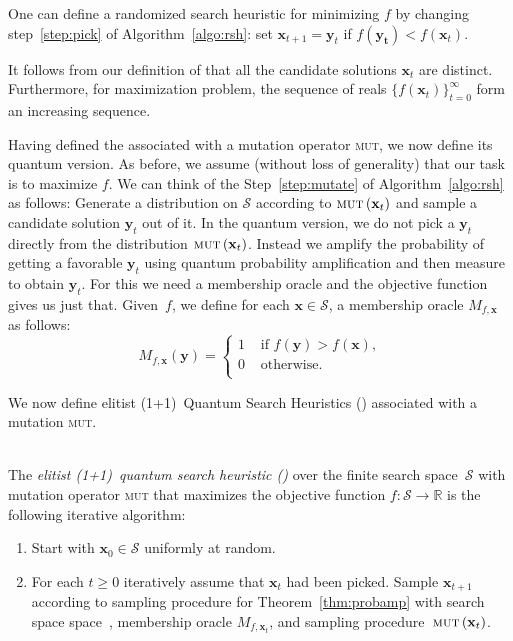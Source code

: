 One can define a randomized search heuristic for minimizing $f$ by changing step~\ref{step:pick} of Algorithm~\ref{algo:rsh}: set $\mathbf{x}_{t+1} = \mathbf{y}_t$ if $f(\mathbf{y_t})<f(\mathbf{x}_t)$.  

It follows from our definition of \rsh{} that all the candidate solutions $\mathbf{x}_t$ are distinct. Furthermore, for maximization problem, the sequence of reals $\{f(\mathbf{x}_t)\}_{t=0}^\infty$ form an increasing sequence.

Having defined the \rsh associated with a mutation operator \textsc{mut}, we now define its quantum version. As before, we assume (without loss of generality) that our task is to maximize $f$. We can think of the Step~\ref{step:mutate} of Algorithm~\ref{algo:rsh} as follows: Generate a distribution on $\mathcal{S}$ according to $\textsc{mut}\left(\mathbf{x}_t\right)$ and sample a candidate solution $\mathbf{y}_t$ out of it. In the quantum version, we do not pick a $\mathbf{y}_t$ directly from the distribution $\textsc{mut}\left(\mathbf{x}_t\right)$. Instead we amplify the probability of getting a favorable $\mathbf{y}_t$ using quantum probability amplification and then measure to obtain $\mathbf{y}_t$. For this we need a membership oracle and the objective function gives us just that. Given~$f$, we define for each $\mathbf{x} \in \mathcal{S}$, a membership oracle $M_{f,\mathbf{x}}$ as follows:
\[
M_{f,\mathbf{x}}(\mathbf{y}) = \left\{ \begin{array}{ll}
 1 & \textrm{ if } f(\mathbf{y}) > f(\mathbf{x})\textrm{,}\\
 0 & \textrm{ otherwise. }\\
 \end{array}\right.
\]

We now define elitist (1+1)~Quantum Search Heuristics (\qrsh{})  associated with a mutation \textsc{mut}.
\begin{algorithm}[\qrsh]\label{algo:qe-rsh}~\\
 The \emph{elitist (1+1)~quantum search heuristic (\qrsh)}  over the finite search space~$\mathcal{S}$ with mutation operator  \textsc{mut} that maximizes the objective function  $f:\mathcal{S}\to\mathbb{R}$ is the following iterative algorithm:
 \begin{enumerate}
\item Start with $\mathbf{x}_0 \in \mathcal{S}$ uniformly at random.
\item For each $t\geq 0$ iteratively assume that $\mathbf{x}_t$ had
  been picked. Sample $\mathbf{x}_{t+1}$ according to sampling
  procedure for Theorem~\ref{thm:probamp} with search space
  space~\SCal, membership oracle $M_{f,\mathbf{x}_t}$, and sampling
  procedure~$\textsc{mut}\left(\mathbf{x}_t\right)$.
\end{enumerate}
\end{algorithm}

